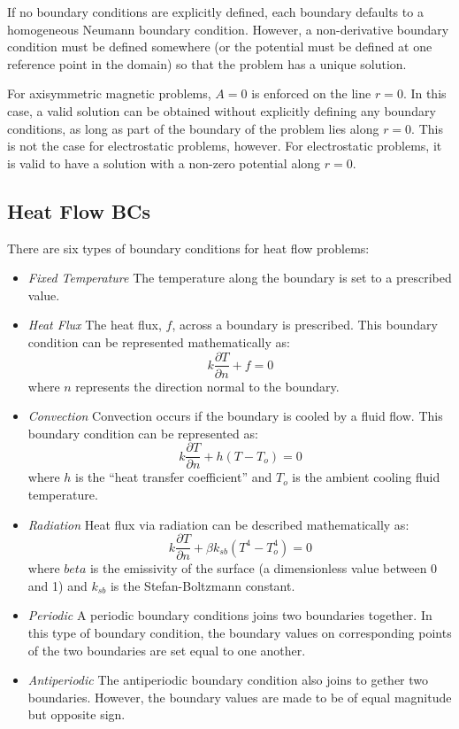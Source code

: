 \documentclass[12pt]{report}
\newcommand{\be}{\begin{equation}}
\newcommand{\ee}{\end{equation}}
\begin{document}
If no boundary conditions are explicitly defined, each boundary
defaults to a homogeneous Neumann boundary condition. However, a
non-derivative boundary condition must be defined somewhere (or the
potential must be defined at one reference point in the domain) so
that the problem has a unique solution.

For axisymmetric magnetic problems, $A=0$ is enforced on the line
$r=0$. In this case, a valid solution can be obtained without
explicitly defining any boundary conditions, as long as part of the
boundary of the problem lies along $r=0$.  This is not the case for
electrostatic problems, however.  For electrostatic problems, it is
valid to have a solution with a non-zero potential along $r=0$.

\subsection{Heat Flow BCs}
There are six types of boundary conditions for heat flow problems:

\begin{itemize}
\item {\em Fixed Temperature} The temperature along the boundary is
set to a prescribed value.
\item {\em Heat Flux} The heat flux, $f$, across a boundary is prescribed.  This
boundary condition can be represented mathematically as:
\be k \frac{\partial T}{\partial n} + f = 0 \ee
where $n$ represents the direction normal to the boundary.
\item {\em Convection} Convection occurs if the boundary is cooled by a fluid flow.
This boundary condition can be represented as:
\be k \frac{\partial T}{\partial n} + h \left( T - T_o \right) = 0 \ee
where $h$ is the ``heat transfer coefficient'' and $T_o$ is the ambient
cooling fluid temperature.
\item {\em Radiation}
Heat flux via radiation can be described mathematically as:
\be k \frac{\partial T}{\partial n} + \beta k_{sb} \left( T^4 - T_o^4 \right) = 0 \ee
where $beta$ is the emissivity of the surface (a dimensionless value between 0 and 1)
and $k_{sb}$ is the Stefan-Boltzmann constant.
\item {\em Periodic}
A periodic boundary conditions joins two boundaries together.  In this
type of boundary condition, the boundary values on 
corresponding points of the two boundaries are set equal to one another.
\item {\em Antiperiodic}
The antiperiodic boundary condition also joins to gether two boundaries.
However, the boundary values are made to be of equal magnitude but
opposite sign.
\end{itemize}
\end{document}
